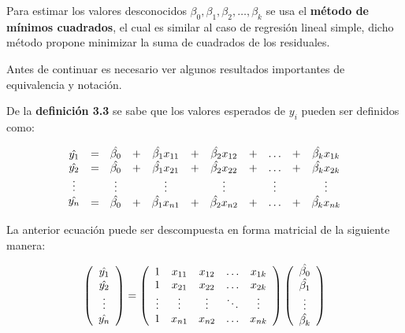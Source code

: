 \documentclass[
  a4paper,
  oneside,
  openany]{book}
\begin{document}
Para estimar los valores desconocidos \(\beta_{0},\beta_{1},\beta_{2},\ldots,\beta_{k}\) se usa el \textbf{método de mínimos cuadrados}, el cual es similar al caso de regresión lineal simple, dicho método propone minimizar la suma de cuadrados de los residuales.

Antes de continuar es necesario ver algunos resultados importantes de equivalencia y notación.

De la \textbf{definición 3.3} se sabe que los valores esperados de \(y_{i}\) pueden ser definidos como:

\[
\begin{array}{c}
\hat{y_{1}} \\
\hat{y_{2}} \\
\vdots \\
\hat{y_{n}}\\
\end{array}
\begin{array}{c c c c c c c c c c}
=&\hat{\beta_{0}}&+&\hat{\beta_{1}} x_{11} &+& \hat{\beta_{2}}x_{12}&+& \ldots &+&\hat{\beta_{k}} x_{1k}\\ 
=&\hat{\beta_{0}}&+&\hat{\beta_{1}} x_{21} &+& \hat{\beta_{2}}x_{22}&+& \ldots &+&\hat{\beta_{k}} x_{2k}\\ 
&\vdots && \vdots && \vdots && \vdots && \vdots\\
=&\hat{\beta_{0}}&+&\hat{\beta_{1}} x_{n1} &+& \hat{\beta_{2}}x_{n2}&+& \ldots &+&\hat{\beta_{k}} x_{nk}\\ 
\end{array}
\]

La anterior ecuación puede ser descompuesta en forma matricial de la siguiente manera:

\[
\left(
\begin{array}{c}
\hat{y_{1}} \\
\hat{y_{2}} \\
\vdots \\
\hat{y_{n}}\\
\end{array}
\right)=
\left(
\begin{array}{c c c c c}
1      & x_{11} & x_{12} & \ldots & x_{1k}\\ 
1      & x_{21} & x_{22} & \ldots & x_{2k}\\
\vdots & \vdots & \vdots & \ddots & \vdots\\
1      & x_{n1} & x_{n2} & \ldots & x_{nk}\\
\end{array}
\right)
\left(
\begin{array}{c}
\hat{\beta_{0}} \\
\hat{\beta_{1}} \\
\vdots \\
\hat{\beta_{k}}\\
\end{array}
\right)
\]
\end{document}
